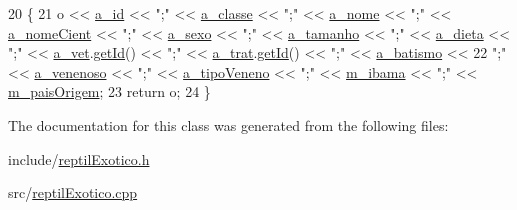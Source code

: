 \begin{DoxyCode}
20 \{
21     o << \hyperlink{classAnimal_a1eab12d1133a739dc0fea720cf6cc927}{a\_id} << \textcolor{stringliteral}{";"} << \hyperlink{classAnimal_a1f32b4455559489b5f5dce71913a6f8f}{a\_classe} << \textcolor{stringliteral}{";"} << \hyperlink{classAnimal_ad815bbe345d7c5274858ac8ccb24bc52}{a\_nome} << \textcolor{stringliteral}{";"} << 
      \hyperlink{classAnimal_af2ae0fc23b0eaf3edaee4579f6199dfc}{a\_nomeCient} << \textcolor{stringliteral}{";"} << \hyperlink{classAnimal_af2b1c520d145f82af7a5a88bb4271a0d}{a\_sexo} << \textcolor{stringliteral}{";"} << \hyperlink{classAnimal_a72366b060dfdbc0dd074fbe41decfcc2}{a\_tamanho} << \textcolor{stringliteral}{";"} << 
      \hyperlink{classAnimal_a32088524517a531af269e3ec04275135}{a\_dieta} << \textcolor{stringliteral}{";"} << \hyperlink{classAnimal_a12ce5681957e27dae674cbbde7fb1e4f}{a\_vet}.\hyperlink{classFuncionario_a0288286a907e587b7ab75d6c23354a06}{getId}() << \textcolor{stringliteral}{";"} << \hyperlink{classAnimal_a19fbf607b29b06a86f598dd1ffb8c712}{a\_trat}.\hyperlink{classFuncionario_a0288286a907e587b7ab75d6c23354a06}{getId}() << \textcolor{stringliteral}{";"} << 
      \hyperlink{classAnimal_a4e308163c5b3d82e546fb39b399bcb71}{a\_batismo} <<
22     \textcolor{stringliteral}{";"} << \hyperlink{classReptil_ab2ebc4cb4f0cf56587b59fdb0d130cf5}{a\_venenoso} << \textcolor{stringliteral}{";"} << \hyperlink{classReptil_ac9ca9b337ca21b72b0ef77b3904b56b7}{a\_tipoVeneno} << \textcolor{stringliteral}{";"} << 
      \hyperlink{classAnimalSilvestre_a4c92c625318b23e550b8bb24fb934d14}{m\_ibama} << \textcolor{stringliteral}{";"} << \hyperlink{classExotico_a4ac7dec507f3420f4c96318c22ec6f36}{m\_paisOrigem};
23     \textcolor{keywordflow}{return} o;
24 \}\end{DoxyCode}


The documentation for this class was generated from the following files\+:\begin{DoxyCompactItemize}
\item 
include/\hyperlink{reptilExotico_8h}{reptil\+Exotico.\+h}\item 
src/\hyperlink{reptilExotico_8cpp}{reptil\+Exotico.\+cpp}\end{DoxyCompactItemize}
